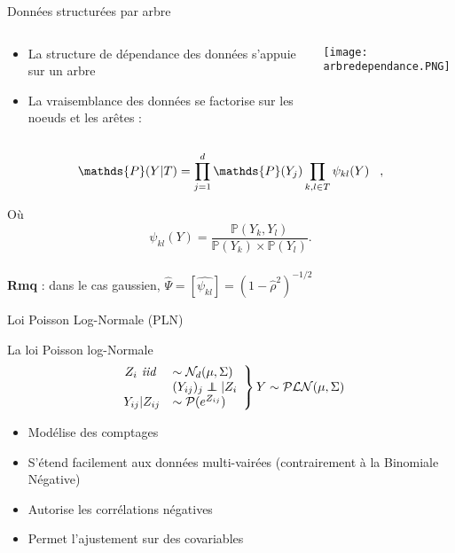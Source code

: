 \documentclass[11pt]{bredelebeamer}
\newcommand\independent{\protect\mathpalette{\protect\independenT}{\perp}}
\def\independenT#1#2{\mathrel{\rlap{$#1#2$}\mkern2mu{#1#2}}}
\begin{document}
\begin{frame}{Données structurées par arbre}
\begin{columns}
 \begin{column}{0.7\linewidth}
 \begin{itemize}
    \item La structure de dépendance des données s'appuie sur un arbre \vspace{1cm}
    \item La vraisemblance des données se factorise sur les noeuds et les arêtes \cite{ChowLiu}:
    \end{itemize}
 \end{column}
 \begin{column}{0.3\linewidth}
 \begin{center}
     \texttt{[image: arbredependance.PNG]}   
    \end{center}
 \end{column}
\end{columns}

\[\mathds{P}(Y|T) =\prod_{j=1}^d \mathds{P}(Y_j)\prod_{k,l \in T}\psi_{kl}(Y) \hspace{0.3cm},\]

Où \[ \psi_{kl}(Y) = \frac{\mathds{P}(Y_k,Y_l)}{\mathds{P}(Y_k)\times \mathds{P}(Y_l)}.\]\\
\vspace{0.4cm}
\textbf{Rmq} : dans le cas gaussien, $\hat{\Psi} = [\hat{\psi_{kl}}] = (1-\hat{\rho}^2)^{-1/2}$
\end{frame}
\begin{frame}{Loi Poisson Log-Normale (PLN)}
    
\begin{exampleblock}{La loi Poisson log-Normale}
\[
            \left.
                \begin{array}{rl}
                Z_i \textit{ iid } &\sim \mathcal{N}_{d}(\mu,\Sigma)\\
                    &(Y_{ij})_j \independent |Z_i\\
                    Y_{ij}|Z_{ij} &\sim \mathcal{P}(e^{Z_{ij}}) 
                   
                \end{array}
            \right \} Y \sim \mathcal{PLN}(\mu, \Sigma)  
            \]
            
       
\end{exampleblock}
\vspace{0.5cm}
\begin{itemize}
    \item Modélise des comptages 
    \item S'étend facilement aux données multi-vairées (contrairement à la Binomiale Négative)
    \item Autorise les corrélations négatives
    \item Permet l'ajustement sur des covariables 
\end{itemize}
\vspace{0.5cm}
\end{frame}
\end{document}
